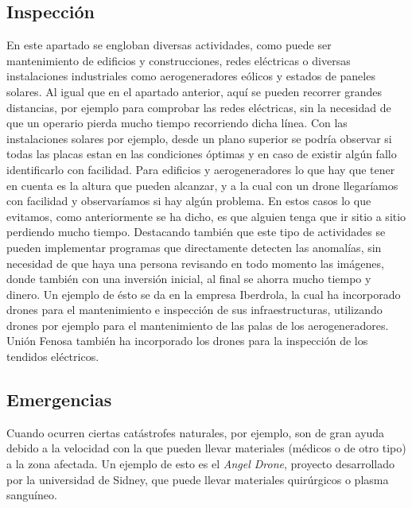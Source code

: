 	\subsection{Inspecci\'on} 
\hspace{1 cm}En este apartado se engloban diversas actividades, como puede ser mantenimiento de edificios y construcciones, redes el\'ectricas o diversas instalaciones industriales como aerogeneradores e\'olicos y estados de paneles solares. Al igual que en el apartado anterior, aqu\'i se pueden recorrer grandes distancias, por ejemplo para comprobar las redes el\'ectricas, sin la necesidad de que un operario pierda mucho tiempo recorriendo dicha l\'inea. Con las instalaciones solares por ejemplo, desde un plano superior se podr\'ia observar si todas las placas estan en las condiciones \'optimas y en caso de existir alg\'un fallo identificarlo con facilidad. Para edificios y aerogeneradores lo que hay que tener en cuenta es la altura que pueden alcanzar, y a la cual con un drone llegar\'iamos con facilidad y observar\'iamos si hay alg\'un problema. En estos casos lo que evitamos, como anteriormente se ha dicho, es que alguien tenga que ir sitio a sitio perdiendo mucho tiempo. Destacando tambi\'en que este tipo de actividades se pueden implementar programas que directamente detecten las anomal\'ias, sin necesidad de que haya una persona revisando en todo momento las im\'agenes, donde tambi\'en con una inversi\'on inicial, al final se ahorra mucho tiempo y dinero. Un ejemplo de \'esto se da en la empresa Iberdrola, la cual ha incorporado drones para el mantenimiento e inspecci\'on de sus infraestructuras, utilizando drones por ejemplo para el mantenimiento de las palas de los aerogeneradores. Uni\'on Fenosa tambi\'en ha incorporado los drones para la inspecci\'on de los tendidos el\'ectricos. 



	\subsection{Emergencias}
\hspace{1 cm} Cuando ocurren ciertas cat\'astrofes naturales, por ejemplo, son de gran ayuda debido a la velocidad con la que pueden llevar materiales (m\'edicos o de otro tipo) a la zona afectada. Un ejemplo de esto es el \textit{Angel Drone}, proyecto desarrollado por la universidad de Sidney, que puede llevar materiales quir\'urgicos o plasma sangu\'ineo.

